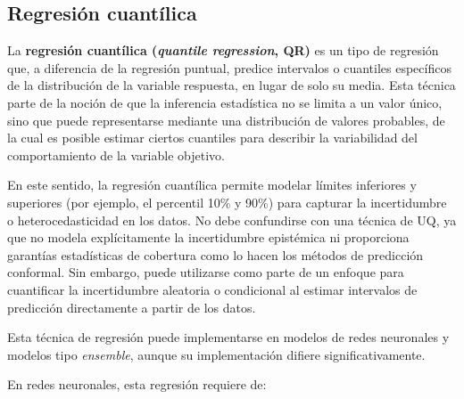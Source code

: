 
\subsection{Regresión cuantílica}

La \textbf{regresión cuantílica (\textit{quantile regression}, \acrshort{QR})} es un tipo de regresión que, a diferencia de la regresión puntual, predice intervalos o cuantiles específicos de la distribución de la variable respuesta, en lugar de solo su media. Esta técnica parte de la noción de que la inferencia estadística no se limita a un valor único, sino que puede representarse mediante una distribución de valores probables, de la cual es posible estimar ciertos cuantiles para describir la variabilidad del comportamiento de la variable objetivo.

En este sentido, la regresión cuantílica permite modelar límites inferiores y superiores (por ejemplo, el percentil 10\% y 90\%) para capturar la incertidumbre o heterocedasticidad en los datos. No debe confundirse con una técnica de \acrshort{UQ}, ya que no modela explícitamente la incertidumbre epistémica ni proporciona garantías estadísticas de cobertura como lo hacen los métodos de predicción conformal. Sin embargo, puede utilizarse como parte de un enfoque para cuantificar la incertidumbre aleatoria o condicional al estimar intervalos de predicción directamente a partir de los datos.

Esta técnica de regresión puede implementarse en modelos de redes neuronales y modelos tipo \textit{ensemble}, aunque su implementación difiere significativamente. 

En redes neuronales, esta regresión requiere de:


